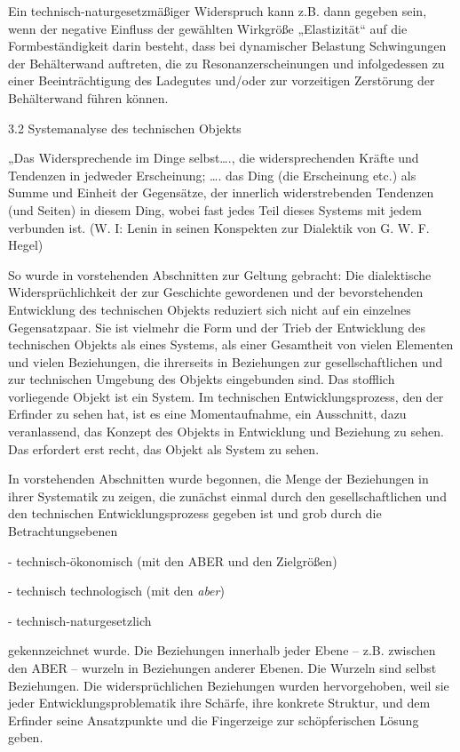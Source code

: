 \documentclass[12pt,a4paper]{article}
\begin{document}
Ein technisch-naturgesetzmäßiger Widerspruch kann z.B. dann gegeben sein, wenn
der negative Einfluss der gewählten Wirkgröße „Elastizität“ auf die
Formbeständigkeit darin besteht, dass bei dynamischer Belastung Schwingungen
der Behälterwand auftreten, die zu Resonanzerscheinungen und infolgedessen zu
einer Beeinträchtigung des Ladegutes und/oder zur vorzeitigen Zerstörung der
Behälterwand führen können.



3.2  Systemanalyse des technischen Objekts

„Das Widersprechende im Dinge selbst…., die widersprechenden Kräfte und Tendenzen in jedweder Erscheinung; …. das Ding (die Erscheinung etc.) als Summe und Einheit der Gegensätze, der innerlich widerstrebenden Tendenzen (und Seiten) in diesem Ding, wobei fast jedes Teil dieses Systems mit jedem verbunden ist. (W. I: Lenin in seinen Konspekten zur Dialektik von G. W. F. Hegel)

So wurde in vorstehenden Abschnitten zur Geltung gebracht: Die dialektische Widersprüchlichkeit der zur Geschichte gewordenen und der bevorstehenden Entwicklung des technischen Objekts reduziert sich nicht auf ein einzelnes Gegensatzpaar. Sie ist vielmehr die Form und der Trieb der Entwicklung des technischen Objekts als eines Systems, als einer Gesamtheit von vielen Elementen und vielen Beziehungen, die ihrerseits in Beziehungen zur gesellschaftlichen und zur technischen Umgebung des Objekts eingebunden sind. Das stofflich vorliegende Objekt ist ein System. Im technischen Entwicklungsprozess, den der Erfinder zu sehen hat, ist es eine Momentaufnahme, ein Ausschnitt, dazu veranlassend, das Konzept des Objekts in Entwicklung und Beziehung zu sehen. Das erfordert erst recht, das Objekt als System zu sehen.

In vorstehenden Abschnitten wurde begonnen, die Menge der Beziehungen in ihrer Systematik zu zeigen, die zunächst einmal durch den gesellschaftlichen und den technischen Entwicklungsprozess gegeben ist und grob durch die Betrachtungsebenen

- technisch-ökonomisch (mit den ABER und den Zielgrößen)

- technisch technologisch (mit den \emph{aber})

- technisch-naturgesetzlich

gekennzeichnet wurde. Die Beziehungen innerhalb jeder Ebene – z.B. zwischen den ABER – wurzeln in Beziehungen anderer Ebenen. Die Wurzeln sind selbst Beziehungen. Die widersprüchlichen Beziehungen wurden hervorgehoben, weil sie jeder Entwicklungsproblematik ihre Schärfe, ihre konkrete Struktur, und dem Erfinder seine Ansatzpunkte und die Fingerzeige zur schöpferischen Lösung geben.
\end{document}
